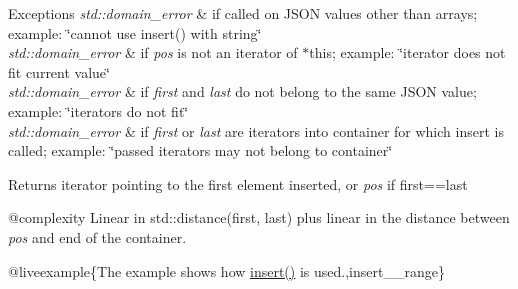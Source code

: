 \begin{DoxyExceptions}{Exceptions}
{\em std\+::domain\+\_\+error} & if called on J\+S\+ON values other than arrays; example\+: {\ttfamily \char`\"{}cannot use insert() with string\char`\"{}} \\
\hline
{\em std\+::domain\+\_\+error} & if {\itshape pos} is not an iterator of $\ast$this; example\+: {\ttfamily \char`\"{}iterator does not fit current value\char`\"{}} \\
\hline
{\em std\+::domain\+\_\+error} & if {\itshape first} and {\itshape last} do not belong to the same J\+S\+ON value; example\+: {\ttfamily \char`\"{}iterators do not fit\char`\"{}} \\
\hline
{\em std\+::domain\+\_\+error} & if {\itshape first} or {\itshape last} are iterators into container for which insert is called; example\+: {\ttfamily \char`\"{}passed iterators may not
belong to container\char`\"{}}\\
\hline
\end{DoxyExceptions}
\begin{DoxyReturn}{Returns}
iterator pointing to the first element inserted, or {\itshape pos} if {\ttfamily first==last}
\end{DoxyReturn}
@complexity Linear in {\ttfamily std\+::distance(first, last)} plus linear in the distance between {\itshape pos} and end of the container.

@liveexample\{The example shows how {\ttfamily \mbox{\hyperlink{classnlohmann_1_1basic__json_a0136728f5db69d4051c77b94307abd6c}{insert()}}} is used.,insert\+\_\+\+\_\+range\}

